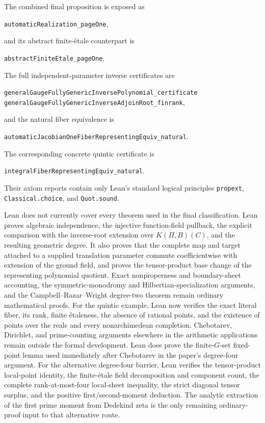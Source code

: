 The combined final proposition is exposed as
\begin{center}
\small\texttt{automaticRealization\_pageOne},
\end{center}
and its abstract finite-\'etale counterpart is
\begin{center}
\small\texttt{abstractFiniteEtale\_pageOne}.
\end{center}
The full independent-parameter inverse certificates are
\begin{center}
\small\texttt{generalGaugeFullyGenericInversePolynomial\_certificate}
\quad{}\quad
\small\texttt{generalGaugeFullyGenericInverseAdjoinRoot\_finrank},
\end{center}
and the natural fiber equivalence is
\begin{center}
\small\texttt{automaticJacobianOneFiberRepresentingEquiv\_natural}.
\end{center}
The corresponding concrete quintic certificate is
\begin{center}
\small\texttt{integralFiberRepresentingEquiv\_natural}.
\end{center}
Their axiom reports contain only Lean's standard logical principles
\texttt{propext}, \texttt{Classical.choice}, and \texttt{Quot.sound}.

Lean does not currently cover every theorem used in the final classification.
Lean proves algebraic independence, the injective function-field pullback,
the explicit comparison with the inverse-root extension over
$K(\Pi,B)(C)$, and the resulting geometric degree.  It also proves that the
complete map and target attached to a supplied translation parameter commute
coefficientwise with extension of the ground field, and proves the
tensor-product base change of the representing polynomial quotient.  Exact
nonproperness and boundary-sheet accounting, the
symmetric-monodromy and Hilbertian-specialization arguments, and the
Campbell--Razar--Wright degree-two theorem remain ordinary mathematical
proofs.
For the quintic example, Lean now verifies the exact literal fiber, its rank,
finite \'etaleness, the absence of rational points, and the existence of
points over the reals and every nonarchimedean completion.  Chebotarev,
Dirichlet, and prime-counting arguments elsewhere in the arithmetic
applications remain outside the formal development.  Lean does prove the
finite-\(G\)-set fixed-point lemma used immediately after Chebotarev in the
paper's degree-four argument.  For the alternative degree-four
barrier, Lean verifies the tensor-product local-point identity, the
finite-\'etale field decomposition and component count, the complete
rank-at-most-four local-sheet inequality, the strict diagonal tensor
surplus, and the positive first/second-moment deduction.  The analytic
extraction of the first prime moment from Dedekind zeta is the only remaining
ordinary-proof input to that alternative route.

